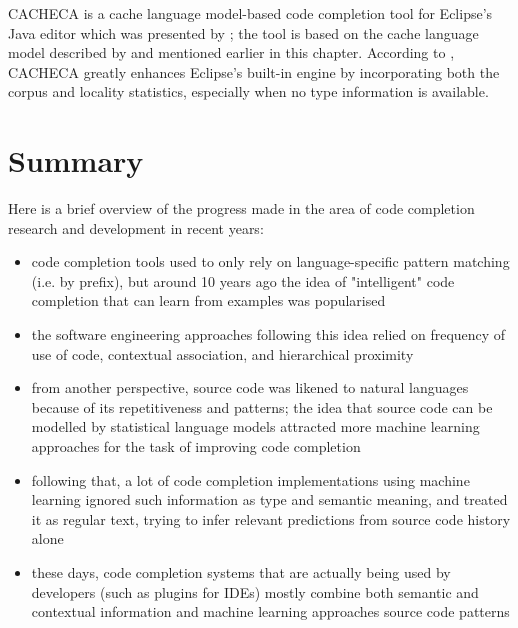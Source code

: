 CACHECA is a cache language model-based code completion tool for Eclipse's Java editor which was presented by \cite{Fran15a}; the tool is based on the cache language model described by \cite{Tu14a} and mentioned earlier in this chapter. According to \cite{Fran15a}, CACHECA greatly enhances Eclipse's built-in engine by incorporating both the corpus and locality statistics, especially when no type information is available.

\section{Summary}
\label{sec:RelatedWorks-Summary}
Here is a brief overview of the progress made in the area of code completion research and development in recent years:

\begin{itemize}
    \item code completion tools used to only rely on language-specific pattern matching (i.e. by prefix), but around 10 years ago the idea of "intelligent" code completion that can learn from examples was popularised
    \item the software engineering approaches following this idea relied on frequency of use of code, contextual association, and hierarchical proximity
    \item from another perspective, source code was likened to natural languages because of its repetitiveness and patterns; the idea that source code can be modelled by statistical language models attracted more machine learning approaches for the task of improving code completion
    \item following that, a lot of code completion implementations using machine learning ignored such information as type and semantic meaning, and treated it as regular text, trying to infer relevant predictions from source code history alone
    \item these days, code completion systems that are actually being used by developers (such as plugins for IDEs) mostly combine both   semantic and contextual information and machine learning approaches  source code patterns
\end{itemize}